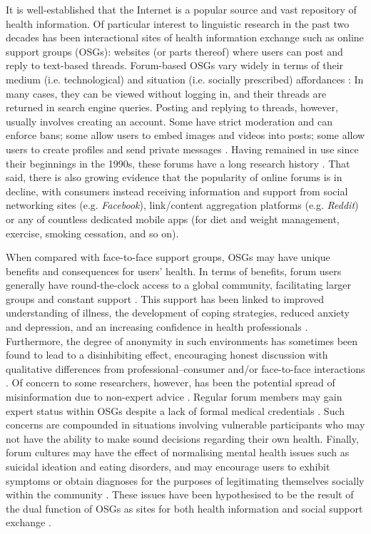 \documentclass{article}
\renewcommand{\cite}{\parencite}
\begin{document}
It is well-established that the Internet is a popular source and vast repository of health information. Of particular interest to linguistic research in the past two decades has been interactional sites of health information exchange such as online support groups (OSGs): websites (or parts thereof) where users can post and reply to text-based threads. Forum-based OSGs vary widely in terms of their medium (i.e. technological) and situation (i.e. socially prescribed) affordances \cite{herring_faceted_2007}: In many cases, they can be viewed without logging in, and their threads are returned in search engine queries. Posting and replying to threads, however, usually involves creating an account. Some have strict moderation and can enforce bans; some allow users to embed images and videos into posts; some allow users to create profiles and send private messages \cite{morzy_analysis_2012}. Having remained in use since their beginnings in the 1990s, these forums have a long research history \cite[e.g.][]{sharf_communicating_1997}. That said, there is also growing evidence that the popularity of online forums is in decline, with consumers instead receiving information and support from social networking sites (e.g. \emph{Facebook}), link\slash content aggregation platforms (e.g. \emph{Reddit}) or any of countless dedicated mobile apps (for diet and weight management, exercise, smoking cessation, and so on).

When compared with face-to-face support groups, OSGs may have unique benefits and consequences for users' health. In terms of benefits, forum users generally have round-the-clock access to a global community, facilitating larger groups and constant support \cite{stommel_online_2010,stommel_use_2011}. This support has been linked to improved understanding of illness, the development of coping strategies, reduced anxiety and depression, and an increasing confidence in health professionals \cite{mulveen_interpretative_2006,swan_sharing_2010,manchaiah_use_2013,yao_impact_2015}. Furthermore, the degree of anonymity in such environments has sometimes been found to lead to a disinhibiting effect, encouraging honest discussion \cite{mo_are_2013} with qualitative differences from professional--consumer and\slash or face-to-face interactions \cite{maclean_forum77:_2015}. Of concern to some researchers, however, has been the potential spread of misinformation due to non-expert advice \cite{ziebland_how_2004}. Regular forum members may gain expert status within OSGs despite a lack of formal medical credentials \cite{hardey_doctor_1999,thompson_credibility_2012}. Such concerns are compounded in situations involving vulnerable participants who may not have the ability to make sound decisions regarding their own health.
Finally, forum cultures may have the effect of normalising mental health issues such as suicidal ideation and eating disorders, and may encourage users to exhibit symptoms or obtain diagnoses for the purposes of legitimating themselves socially within the community \cite{horne_doing_2009,vayreda_social_2009}. These issues have been hypothesised to be the result of the dual function of OSGs as sites for both health information and social support exchange \cite{nambisan_information_2011,attard_thematic_2012}.
\end{document}
